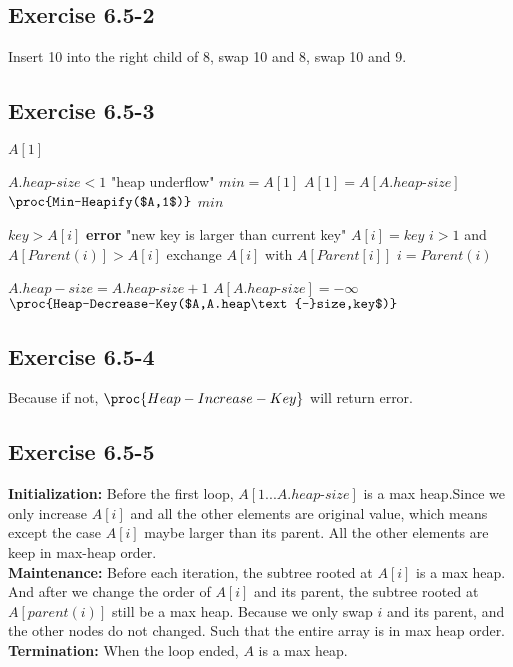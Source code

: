 \documentclass[12pt]{article}
\theoremstyle{definition}
\theoremstyle{remark}
\begin{document}
\subsection*{Exercise 6.5-2}
Insert 10 into the right child of 8, swap 10 and 8, swap 10 and 9.
\subsection*{Exercise 6.5-3}
\begin{codebox}
\li \Return $A[1]$
\end{codebox}
\begin{codebox}
\li \If $A.heap\text{-}size<1$
\li \quad \Return "heap underflow"
\li $min=A[1]$
\li $A[1]=A[A.heap\text{-}size]$
\li $\proc{Min-Heapify($A,1$)}$
\li \Return $min$
\end{codebox}
\begin{codebox}
\li \If $key>A[i]$
\li \quad \textbf{error} "new key is larger than current key"
\li $A[i]=key$
\li \While $i>1$ and $A[Parent(i)]>A[i]$
\li \quad exchange $A[i]$ with $A[Parent[i]]$
\li \quad $i=Parent(i)$
\end{codebox}
\begin{codebox}
\li $A.heap-size=A.heap\text{-}size+1$
\li $A[A.heap\text{-}size]=-\infty$
\li $\proc{Heap-Decrease-Key($A,A.heap\text{-}size,key$)}$
\end{codebox}
\subsection*{Exercise 6.5-4}
Because if not, $\proc{Heap-Increase-Key}$ will return error.
\subsection*{Exercise 6.5-5}
\textbf{Initialization:} Before the first loop, $A[1...A.heap\text{-}size]$ is a max heap.Since we only increase $A[i]$ and all the other elements are original value, which means except the case $A[i]$ maybe larger than its parent. All the other elements are keep in max-heap order.\\
\textbf{Maintenance:} Before each iteration, the subtree rooted at $A[i]$ is a max heap. And after we change the order of $A[i]$ and its parent, the subtree rooted at $A[parent(i)]$ still be a max heap. Because we only swap $i$ and its parent, and the other nodes do not changed. Such that the entire array is in max heap order.\\
\textbf{Termination:} When the loop ended, $A$ is a max heap.
\end{document}
